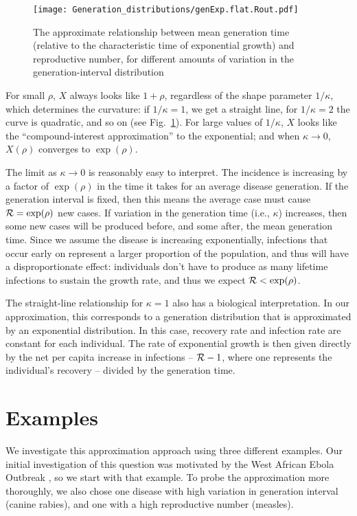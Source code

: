 \documentclass[12pt,]{article}
\newcommand{\RR}{\ensuremath{{\cal R}}}
\newcommand{\fref}[1]{Fig.~\ref{fig:#1}}
\begin{document}
\begin{figure}[htbp]
	\centering \texttt{[image: Generation\_distributions/genExp.flat.Rout.pdf]}
	\caption{
		The approximate relationship between mean generation time (relative to
		the characteristic time of exponential growth) and reproductive number,
		for different amounts of variation in the generation-interval
		distribution
	} \label{fig:genExp} 
\end{figure}

For small $\rho$, $X$ always looks like $1+\rho$, regardless of the shape parameter $1/\kappa$, which determines the curvature: if $1/\kappa = 1$, we get a straight line, for $1/\kappa=2$ the curve is quadratic, and so on (see \fref{genExp}).
For large values of $1/\kappa$, $X$ looks like the ``compound-interest approximation'' to the exponential; and when $\kappa \to 0$, $X(\rho)$ converges to $\exp(\rho)$.

The limit as $\kappa\to 0$ is reasonably easy to interpret. The incidence is increasing by a factor of $\exp(\rho)$ in the time it takes for an average disease generation. If the generation interval is fixed, then this means the average case must cause $\RR = \exp(\rho)$ new cases.
If variation in the generation time (i.e., $\kappa$) increases, then some new cases will be produced before, and some after, the mean generation time.
Since we assume the disease is increasing exponentially, infections that occur early on represent a larger proportion of the population, and thus will have a disproportionate effect: individuals don't have to produce as many lifetime infections to sustain the growth rate, and thus we expect  $\RR < \exp(\rho)$.

The straight-line relationship for $\kappa=1$ also has a biological interpretation. 
In our approximation, this corresponds to a generation distribution that is approximated by an exponential distribution. 
In this case, recovery rate and infection rate are constant for each individual.
The rate of exponential growth is then given directly by the net per capita increase in infections -- $\RR-1$, where one represents the individual's recovery -- divided by the generation time.

\section{Examples}

We investigate this approximation approach using three different examples. Our initial investigation of this question was motivated by the West African Ebola Outbreak \cite{WeitDush15}, so we start with that example. To probe the approximation more thoroughly, we also chose one disease with high variation in generation interval (canine rabies), and one with a high reproductive number (measles).
\end{document}
